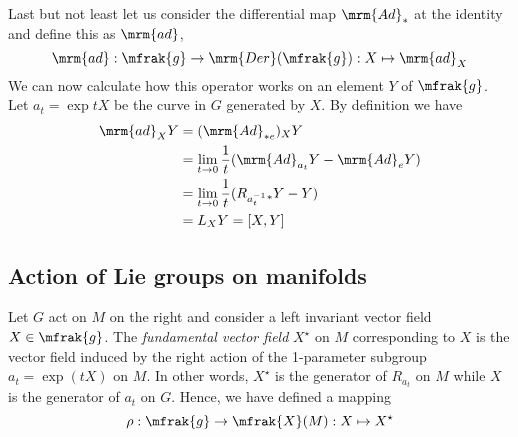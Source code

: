 \documentclass[10pt,reqno]{amsart}
\numberwithin{equation}{section}
\begin{document}
Last but not least let us consider the differential map 
$\mrm{Ad}_\ast$ at the identity and define this as $\mrm{ad}$,
%
\begin{equation}
	\mrm{ad} : \mfrak{g} \rightarrow \mrm{Der}(\mfrak{g}) : X 
	\mapsto \mrm{ad}_X
\end{equation}
%
We can now calculate how this operator works on an element $Y$ of 
$\mfrak{g}$. Let $a_t = \exp tX$ be the curve in $G$ generated by 
$X$. By definition we have
%
\begin{displaymath}
	\begin{split}
		\mrm{ad}_X Y &= (\mrm{Ad}_{\ast e})_X Y \\
		&= \lim_{t \rightarrow 0}\frac{1}{t} (\mrm{Ad}_{a_t} Y - 
		\mrm{Ad}_e Y) \\
		&= \lim_{t \rightarrow 0}\frac{1}{t} (R_{a_{t}^{-1}}{}_\ast Y 
		- Y) \\
		&= L_X Y = [X,Y]
	\end{split}
\end{displaymath}



\subsection{Action of Lie groups on manifolds}

\begin{definition}
\end{definition}
%
Let $G$ act on $M$ on the right and consider a left invariant 
vector field $X \in \mfrak{g}$. The \emph{fundamental vector 
	field} $X^\star$ on $M$ corresponding to $X$ is the vector 
field induced by the right action of the 1-parameter subgroup 
$a_t = \exp(tX)$ on $M$. In other words, $X^\star$ is the 
generator of $R_{a_t}$ on $M$ while $X$ is the generator of $a_t$ 
on $G$.  Hence, we have defined a mapping
%
\begin{equation}
	\rho : \mfrak{g} \rightarrow \mfrak{X}(M) : X \mapsto X^\star
\end{equation}
%
\end{document}
